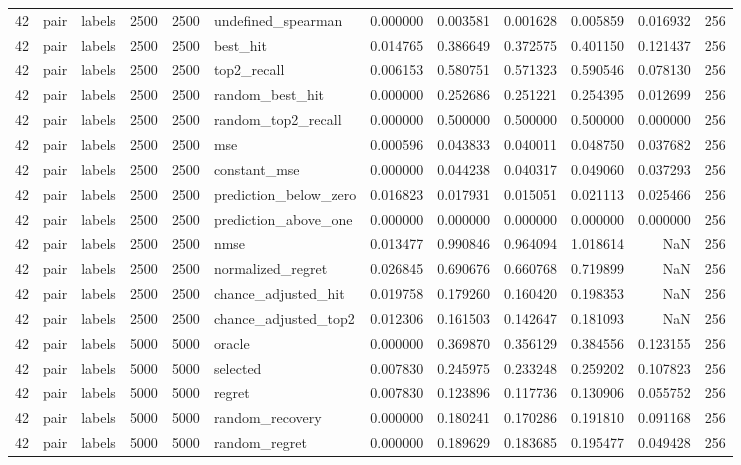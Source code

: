 \begin{tabular}{rllrrlrrrrrr}
42 & pair & labels & 2500 & 2500 & undefined_spearman & 0.000000 & 0.003581 & 0.001628 & 0.005859 & 0.016932 & 256 \\
42 & pair & labels & 2500 & 2500 & best_hit & 0.014765 & 0.386649 & 0.372575 & 0.401150 & 0.121437 & 256 \\
42 & pair & labels & 2500 & 2500 & top2_recall & 0.006153 & 0.580751 & 0.571323 & 0.590546 & 0.078130 & 256 \\
42 & pair & labels & 2500 & 2500 & random_best_hit & 0.000000 & 0.252686 & 0.251221 & 0.254395 & 0.012699 & 256 \\
42 & pair & labels & 2500 & 2500 & random_top2_recall & 0.000000 & 0.500000 & 0.500000 & 0.500000 & 0.000000 & 256 \\
42 & pair & labels & 2500 & 2500 & mse & 0.000596 & 0.043833 & 0.040011 & 0.048750 & 0.037682 & 256 \\
42 & pair & labels & 2500 & 2500 & constant_mse & 0.000000 & 0.044238 & 0.040317 & 0.049060 & 0.037293 & 256 \\
42 & pair & labels & 2500 & 2500 & prediction_below_zero & 0.016823 & 0.017931 & 0.015051 & 0.021113 & 0.025466 & 256 \\
42 & pair & labels & 2500 & 2500 & prediction_above_one & 0.000000 & 0.000000 & 0.000000 & 0.000000 & 0.000000 & 256 \\
42 & pair & labels & 2500 & 2500 & nmse & 0.013477 & 0.990846 & 0.964094 & 1.018614 & NaN & 256 \\
42 & pair & labels & 2500 & 2500 & normalized_regret & 0.026845 & 0.690676 & 0.660768 & 0.719899 & NaN & 256 \\
42 & pair & labels & 2500 & 2500 & chance_adjusted_hit & 0.019758 & 0.179260 & 0.160420 & 0.198353 & NaN & 256 \\
42 & pair & labels & 2500 & 2500 & chance_adjusted_top2 & 0.012306 & 0.161503 & 0.142647 & 0.181093 & NaN & 256 \\
42 & pair & labels & 5000 & 5000 & oracle & 0.000000 & 0.369870 & 0.356129 & 0.384556 & 0.123155 & 256 \\
42 & pair & labels & 5000 & 5000 & selected & 0.007830 & 0.245975 & 0.233248 & 0.259202 & 0.107823 & 256 \\
42 & pair & labels & 5000 & 5000 & regret & 0.007830 & 0.123896 & 0.117736 & 0.130906 & 0.055752 & 256 \\
42 & pair & labels & 5000 & 5000 & random_recovery & 0.000000 & 0.180241 & 0.170286 & 0.191810 & 0.091168 & 256 \\
42 & pair & labels & 5000 & 5000 & random_regret & 0.000000 & 0.189629 & 0.183685 & 0.195477 & 0.049428 & 256 \\

\end{tabular}
